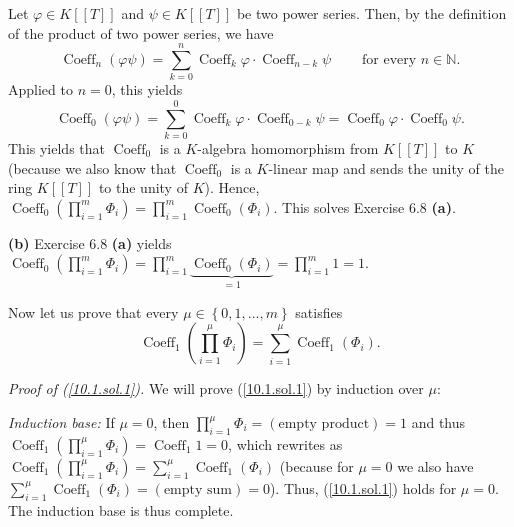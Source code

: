 \documentclass[numbers=enddot,12pt,final,onecolumn,notitlepage]{scrartcl}%
\begin{document}
Let $\varphi\in K\left[  \left[  T\right]  \right]  $ and $\psi\in K\left[
\left[  T\right]  \right]  $ be two power series. Then, by the definition of
the product of two power series, we have%
\begin{equation}
\operatorname*{Coeff}\nolimits_{n}\left(  \varphi\psi\right)  =\sum_{k=0}%
^{n}\operatorname*{Coeff}\nolimits_{k}\varphi\cdot\operatorname*{Coeff}%
\nolimits_{n-k}\psi\ \ \ \ \ \ \ \ \ \ \text{for every }n\in\mathbb{N}\text{.}
\label{10.1.sol.0}%
\end{equation}
Applied to $n=0$, this yields%
\[
\operatorname*{Coeff}\nolimits_{0}\left(  \varphi\psi\right)  =\sum_{k=0}%
^{0}\operatorname*{Coeff}\nolimits_{k}\varphi\cdot\operatorname*{Coeff}%
\nolimits_{0-k}\psi=\operatorname*{Coeff}\nolimits_{0}\varphi\cdot
\operatorname*{Coeff}\nolimits_{0}\psi.
\]
This yields that $\operatorname*{Coeff}\nolimits_{0}$ is a $K$-algebra
homomorphism from $K\left[  \left[  T\right]  \right]  $ to $K$ (because we
also know that $\operatorname*{Coeff}\nolimits_{0}$ is a $K$-linear map and
sends the unity of the ring $K\left[  \left[  T\right]  \right]  $ to the
unity of $K$). Hence, $\operatorname*{Coeff}\nolimits_{0}\left(
\prod\limits_{i=1}^{m}\Phi_{i}\right)  =\prod\limits_{i=1}^{m}%
\operatorname*{Coeff}\nolimits_{0}\left(  \Phi_{i}\right)  $. This solves
Exercise 6.8 \textbf{(a)}.

\textbf{(b)} Exercise 6.8 \textbf{(a)} yields $\operatorname*{Coeff}%
\nolimits_{0}\left(  \prod\limits_{i=1}^{m}\Phi_{i}\right)  =\prod
\limits_{i=1}^{m}\underbrace{\operatorname*{Coeff}\nolimits_{0}\left(
\Phi_{i}\right)  }_{=1}=\prod\limits_{i=1}^{m}1=1$.

Now let us prove that every $\mu\in\left\{  0,1,...,m\right\}  $ satisfies%
\begin{equation}
\operatorname*{Coeff}\nolimits_{1}\left(  \prod\limits_{i=1}^{\mu}\Phi
_{i}\right)  =\sum\limits_{i=1}^{\mu}\operatorname*{Coeff}\nolimits_{1}\left(
\Phi_{i}\right)  . \label{10.1.sol.1}%
\end{equation}


\textit{Proof of (\ref{10.1.sol.1}).} We will prove (\ref{10.1.sol.1}) by
induction over $\mu$:

\textit{Induction base:} If $\mu=0$, then $\prod\limits_{i=1}^{\mu}\Phi
_{i}=\left(  \text{empty product}\right)  =1$ and thus $\operatorname*{Coeff}%
\nolimits_{1}\left(  \prod\limits_{i=1}^{\mu}\Phi_{i}\right)
=\operatorname*{Coeff}\nolimits_{1}1=0$, which rewrites as
$\operatorname*{Coeff}\nolimits_{1}\left(  \prod\limits_{i=1}^{\mu}\Phi
_{i}\right)  =\sum\limits_{i=1}^{\mu}\operatorname*{Coeff}\nolimits_{1}\left(
\Phi_{i}\right)  $ (because for $\mu=0$ we also have $\sum\limits_{i=1}^{\mu
}\operatorname*{Coeff}\nolimits_{1}\left(  \Phi_{i}\right)  =\left(
\text{empty sum}\right)  =0$). Thus, (\ref{10.1.sol.1}) holds for $\mu=0$. The
induction base is thus complete.
\end{document}
